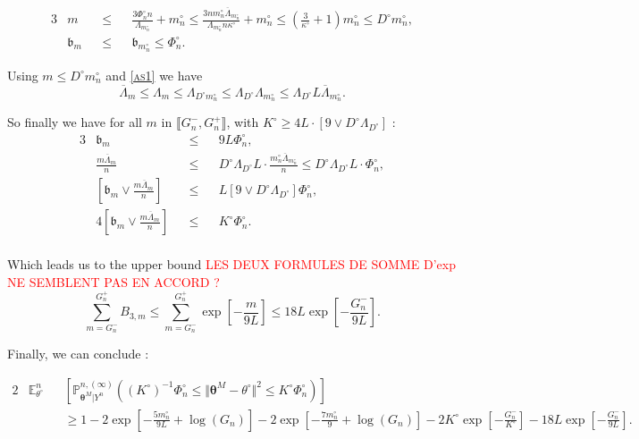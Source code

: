 \begin{alignat*}{3}
& m && \leq && \frac{3 \Phi_{n}^{\circ} n}{\Lambda_{m_{n}^{\circ}}} + m_{n}^{\circ} \leq \frac{3 n m_{n}^{\circ} \overline{\Lambda}_{m_{n}^{\circ}}}{\Lambda_{m_{n}^{\circ}} n \kappa^{\circ}} + m_{n}^{\circ} \leq \left(\frac{3}{\kappa^{\circ}} + 1\right) m_{n}^{\circ} \leq D^{\circ} m_{n}^{\circ},\\ 
& \mathfrak{b}_{m} && \leq && \mathfrak{b}_{m_{n}^{\circ}} \leq \Phi_{n}^{\circ}.
\end{alignat*}

Using $m \leq D^{\circ} m_{n}^{\circ}$ and \textsc{\cref{as1}} we have
\[\overline{\Lambda}_{m} \leq \Lambda_{m} \leq \Lambda_{D^{\circ} m_{n}^{\circ}} \leq \Lambda_{D^{\circ}} \Lambda_{m_{n}^{\circ}} \leq \Lambda_{D^{\circ}} L \overline{\Lambda}_{m_{n}^{\circ}}.\]

So finally we have for all $m$ in $\llbracket G_{n}^{-}, G_{n}^{+}\rrbracket$, with $K^{\circ} \geq 4L \cdot \left[9 \vee D^{\circ} \Lambda_{D^{\circ}}\right]$ :
\begin{alignat*}{3}
& \mathfrak{b}_{m} && \leq && 9 L \Phi_{n}^{\circ},\\
& \frac{m \overline{\Lambda}_{m}}{n} && \leq && D^{\circ} \Lambda_{D^{\circ}} L \cdot \frac{m_{n}^{\circ} \overline{\Lambda}_{m_{n}^{\circ}}}{n} \leq D^{\circ} \Lambda_{D^{\circ}} L \cdot \Phi_{n}^{\circ},\\
& \left[\mathfrak{b}_{m} \vee \frac{m \overline{\Lambda}_{m}}{n}\right] && \leq && L \left[9 \vee D^{\circ} \Lambda_{D^{\circ}}\right] \Phi_{n}^{\circ},\\
& 4 \left[\mathfrak{b}_{m} \vee \frac{m \overline{\Lambda}_{m}}{n}\right] && \leq && K^{\circ} \Phi_{n}^{\circ}.\\
\end{alignat*}

Which leads us to the upper bound \textcolor{red}{LES DEUX FORMULES DE SOMME D'exp NE SEMBLENT PAS EN ACCORD ?}
\[\sum\limits_{m = G_{n}^{-}}^{G_{n}^{+}}B_{3, m} \leq \sum\limits_{m = G_{n}^{-}}^{G_{n}^{+}} \exp\left[- \frac{m}{9 L}\right] \leq 18L \exp\left[-\frac{G_{n}^{-}}{9 L}\right].\]

\bigskip

Finally, we can conclude :

\begin{alignat*}{2}
& \mathds{E}_{\theta^{\circ}}^{n} && \left[\mathds{P}_{\boldsymbol{\theta}^{M}\vert Y^{n}}^{n, (\infty)}\left(\left(K^{\circ}\right)^{-1}\Phi_{n}^{\circ} \leq \Vert \boldsymbol{\theta}^{M} - \theta^{\circ} \Vert ^{2} \leq K^{\circ} \Phi_{n}^{\circ}\right)\right]\\
& && \geq 1 - 2 \exp\left[- \frac{5 m_{n}^{\circ}}{9 L} + \log\left(G_{n}\right)\right] - 2 \exp\left[- \frac{7 m_{n}^{\circ}}{9} + \log\left(G_{n}\right)\right] - 2 K^{\circ} \exp\left[- \frac{G_{n}^{-}}{K^{\circ}}\right] - 18 L \exp\left[- \frac{G_{n}^{-}}{9L}\right].
\end{alignat*}